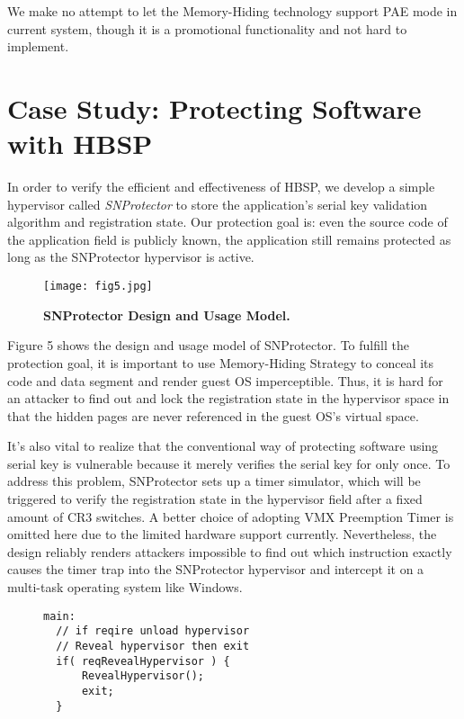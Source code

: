 \documentclass[conference]{IEEEtran}
\begin{document}
{We make no attempt to let the Memory-Hiding technology support PAE
mode in current system, though it is a promotional functionality
and not hard to implement.

\bigskip

\section{Case Study: Protecting Software with HBSP}
In order to verify the efficient and effectiveness of HBSP, we
develop a simple hypervisor called \emph{SNProtector} to store the
application's serial key validation algorithm and registration
state. Our protection goal is: even the source code of the
application field is publicly known, the application still remains
protected as long as the SNProtector hypervisor is active.

\begin{figure}[!htb]
\begin{center}
\texttt{[image: fig5.jpg]}
\end{center}
\caption{{\bf SNProtector Design and Usage Model.}} \label{Figure
5.}
\end{figure}

Figure 5 shows the design and usage model of SNProtector. To fulfill
the protection goal, it is important to use Memory-Hiding Strategy
to conceal its code and data segment and render guest OS
imperceptible. Thus, it is hard for an attacker to find out and lock
the registration state in the hypervisor space in that the hidden
pages are never referenced in the guest OS's virtual space.

It's also vital to realize that the conventional way of protecting
software using serial key is vulnerable because it merely verifies
the serial key for only once. To address this problem, SNProtector
sets up a timer simulator, which will be triggered to verify the
registration state in the hypervisor field after a fixed amount of
CR3 switches. A better choice of adopting VMX Preemption Timer is
omitted here due to the limited hardware support currently.
Nevertheless, the design reliably renders attackers impossible to
find out which instruction exactly causes the timer trap into the
SNProtector hypervisor and intercept it on a multi-task operating
system like Windows.

\begin{figure}
\begin{lstlisting}
main:
  // if reqire unload hypervisor
  // Reveal hypervisor then exit
  if( reqRevealHypervisor ) {
      RevealHypervisor();
      exit;
  }


\end{lstlisting}
\end{figure}}
\end{document}
